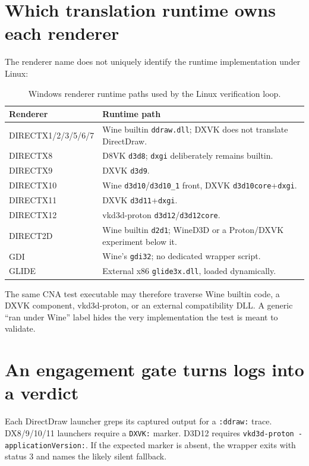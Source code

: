 \section{Which translation runtime owns each renderer}

The renderer name does not uniquely identify the runtime implementation under Linux:

\begin{table}[htbp]
  \centering
  \caption{Windows renderer runtime paths used by the Linux verification loop.}
  \label{tab:wine-runtime-map}
  \begin{tabular}{@{}p{}p{}@{}}
    \toprule
    Renderer & Runtime path \\
    \midrule
    DIRECTX1/2/3/5/6/7 & Wine builtin \texttt{ddraw.dll}; DXVK does not translate DirectDraw. \\
    DIRECTX8 & D8VK \texttt{d3d8}; \texttt{dxgi} deliberately remains builtin. \\
    DIRECTX9 & DXVK \texttt{d3d9}. \\
    DIRECTX10 & Wine \texttt{d3d10}/\texttt{d3d10\_1} front, DXVK \texttt{d3d10core}+\texttt{dxgi}. \\
    DIRECTX11 & DXVK \texttt{d3d11}+\texttt{dxgi}. \\
    DIRECTX12 & vkd3d-proton \texttt{d3d12}/\texttt{d3d12core}. \\
    DIRECT2D & Wine builtin \texttt{d2d1}; WineD3D or a Proton/DXVK experiment below it. \\
    GDI & Wine's \texttt{gdi32}; no dedicated wrapper script. \\
    GLIDE & External x86 \texttt{glide3x.dll}, loaded dynamically. \\
    \bottomrule
  \end{tabular}
\end{table}

The same CNA test executable may therefore traverse Wine builtin code, a DXVK component,
vkd3d-proton, or an external compatibility DLL. A generic ``ran under Wine'' label hides the
very implementation the test is meant to validate.

\section{An engagement gate turns logs into a verdict}

Each DirectDraw launcher greps its captured output for a \texttt{:ddraw:} trace. DX8/9/10/11
launchers require a \texttt{DXVK:} marker. D3D12 requires
\texttt{vkd3d-proton - applicationVersion:}. If the expected marker is absent, the wrapper exits
with status 3 and names the likely silent fallback.

